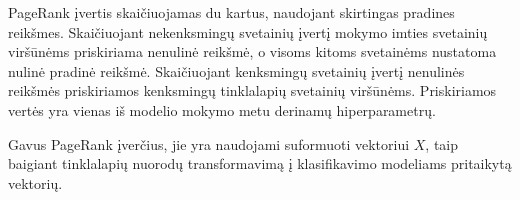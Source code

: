PageRank įvertis skaičiuojamas du kartus, naudojant skirtingas pradines reikšmes. Skaičiuojant nekenksmingų svetainių įvertį mokymo imties svetainių viršūnėms priskiriama nenulinė reikšmė, o visoms kitoms svetainėms nustatoma nulinė pradinė reikšmė. Skaičiuojant kenksmingų svetainių įvertį nenulinės reikšmės priskiriamos kenksmingų tinklalapių svetainių viršūnėms. Priskiriamos vertės yra vienas iš modelio mokymo metu derinamų hiperparametrų.

Gavus PageRank įverčius, jie yra naudojami suformuoti vektoriui $X$, taip baigiant tinklalapių nuorodų transformavimą į klasifikavimo modeliams pritaikytą vektorių.

